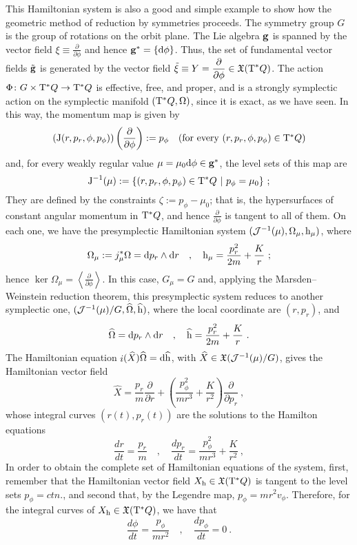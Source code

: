\documentclass[12pt]{report}
\def\dst{\displaystyle}
\def\derpar#1#2{\frac{\partial{#1}}{\partial{#2}}}
\def\vf{\mathfrak X}
\def\d{{\rm d}}
\def\Tan{{\rm T}}
\def\inn{\mathop{i}\nolimits}
\begin{document}
This Hamiltonian system is also a good and simple example to show how the geometric method of reduction by symmetries proceeds.
The symmetry group $G$ is the group of rotations on the orbit plane.
The Lie algebra ${\bf g}$ is spanned by the vector field
$\displaystyle\xi\equiv\derpar{}{\phi}$ and hence ${\bf g}^*=\{\d\phi\}$.
Thus, the set of fundamental vector fields $\tilde{\bf g}$ is generated by
the vector field $\displaystyle\tilde\xi\equiv Y=\derpar{}{\phi}\in\vf(\Tan^*Q)$.
The action $\Phi\colon G\times\Tan^*Q\to\Tan^*Q$ is effective, free, and proper,
and is a strongly symplectic action on the symplectic manifold $(\Tan^*Q,\Omega)$, since it is exact, as we have seen.
In this way, the momentum map is given by
$$
({\rm J}(r,p_r,\phi,p_\phi))\left(\derpar{}{\phi}\right):=p_\phi
\quad \mbox{\rm (for every $(r,p_r,\phi,p_\phi)\in\Tan^*Q$)}
$$
and, for every weakly regular value
$\mu =\mu_0\d\phi\in{\bf g}^*$, the level sets of this map are
$$
{\rm J}^{-1}(\mu):=\{ (r,p_r,\phi,p_\phi)\in\Tan^*Q\ \vert\ p_\phi=\mu_0\} \ ;
$$
They are defined by the constraints $\zeta :=p_\phi-\mu_0$;
that is, the hypersurfaces of constant angular momentum in $\Tan^*Q$,
and hence $\dst\derpar{}{\phi}$ is tangent to all of them.
On each one, we have the presymplectic Hamiltonian system
$({\cal J}^{-1}(\mu),\Omega_\mu,{\rm h}_\mu)$, where
$$
\Omega_\mu :=j_\mu^*\Omega=\d p_r\wedge\d r
\quad , \quad
{\rm h}_\mu=\frac{p_r^2}{2m}+\frac{K}{r} \ ;
$$
hence $\displaystyle\ker\Omega_\mu=\left\langle\derpar{}{\phi}\right\rangle$.
In this case, $G_\mu=G$ and, applying the Marsden--Weinstein reduction theorem,
this presymplectic system reduces to another symplectic one,
$({\cal J}^{-1}(\mu )/G,\widehat\Omega,\widehat{\rm h})$,
where the local coordinate are $(r,p_r)$, and
$$
\widehat\Omega =\d p_r\wedge\d r
\quad , \quad
\widehat{\rm h}=\frac{p_r^2}{2m}+\frac{K}{r} \ .
$$
The Hamiltonian equation $\inn(\widehat X)\widehat\Omega =\d\widehat{\rm h}$,
with $\widehat X\in\vf({\cal J}^{-1}(\mu)/G)$,
gives the Hamiltonian vector field
$$
\widehat X=\frac{p_r}{m}\derpar{}{r}+\left(\frac{p_\phi^2}{mr^3}+\frac{K}{r^2}\right)\derpar{}{p_r} \ ,
$$
whose integral curves $(r(t),p_r(t))$ are the solutions to the Hamilton equations
$$
\frac{dr}{dt}=\frac{p_r}{m} \quad , \quad 
\frac{dp_r}{dt}=\frac{p_\phi^2}{mr^3}+\frac{K}{r^2} \ ,
$$
In order to obtain the complete set of Hamiltonian equations of the system,
first, remember that the Hamiltonian vector field $X_{\rm h}\in\vf(\Tan^*Q)$ is tangent to the level sets $p_\phi=ctn.$, 
and second that, by the Legendre map, $p_\phi=mr^2v_\phi$.
Therefore, for the integral curves of $X_{\rm h}\in\vf(\Tan^*Q)$, we have that
$$
\frac{d\phi}{dt}=\frac{p_\phi}{mr^2} \quad , \quad
\frac{dp_\phi}{dt}=0 \ .
$$
\end{document}
